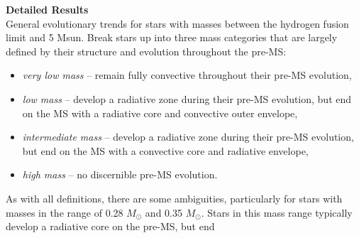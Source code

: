 \textbf{Detailed Results} \\
General evolutionary trends for stars with masses between the hydrogen fusion limit and 5 Msun. Break stars up into three mass categories that are largely defined by their structure and evolution throughout the pre-MS: 
\begin{itemize}
 \item {\it very low mass} -- remain fully convective throughout their pre-MS evolution,
 \item {\it low mass} -- develop a radiative zone during their pre-MS evolution, but end on the MS with a radiative core and convective outer envelope,
 \item {\it intermediate mass} -- develop a radiative zone during their pre-MS evolution, but end on the MS with a convective core and radiative envelope,
 \item {\it high mass} -- no discernible pre-MS evolution.
\end{itemize}
As with all definitions, there are some ambiguities, particularly for stars with masses in the range of 0.28 $M_{\odot}$ and 0.35 $M_{\odot}$. Stars in this mass range typically develop a radiative core on the pre-MS, but end 